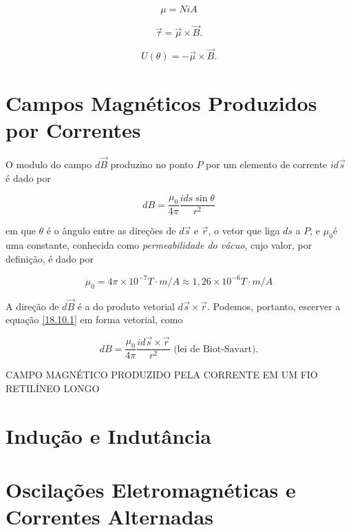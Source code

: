 \begin{equation}
    \mu=NiA
\end{equation}

\begin{equation}
    \vec{\tau}=\vec{\mu}\times \vec{B}.
\end{equation}

\begin{equation}
    U(\theta)=-\vec{\mu}\times \vec{B}.
\end{equation}

\section{Campos Magnéticos Produzidos por Correntes}

O modulo do campo $d\vec{B}$ produzino no ponto $P$ por um elemento de corrente $id\vec{s}$ é dado por

\begin{equation}\label{18.10.1}
dB=\dfrac{\mu_0}{4\pi} \dfrac{i ds \sin \theta}{r^2}
\end{equation}

em que $\theta$ é o ângulo entre as direções de $d\vec{s}$ e $\vec{r}$, o vetor que liga $ds$ a $P$, e $\mu_0$é uma constante, conhecida como \textit{permeabilidade do vácuo}, cujo valor, por definição, é dado por

\begin{equation}
\mu_0=4\pi \times 10^{-7} T\cdot m/A \approx 1,26\times 10 ^{-6} T\cdot m/A
\end{equation}

A direção de $d\vec{B}$ é a do produto vetorial $d\vec{s}\times \vec{r}$. Podemos, portanto, escerver a equação \eqref{18.10.1} em forma vetorial, como

\begin{equation}\label{18.10.3}
dB=\dfrac{\mu_0}{4\pi} \dfrac{i d\vec{s}\times \vec{r}}{r^2} \mbox{ (lei de Biot-Savart)}.
\end{equation}

CAMPO MAGNÉTICO PRODUZIDO PELA CORRENTE EM UM FIO RETILÍNEO LONGO





\section{Indução e Indutância}

\section{Oscilações Eletromagnéticas e Correntes Alternadas}

